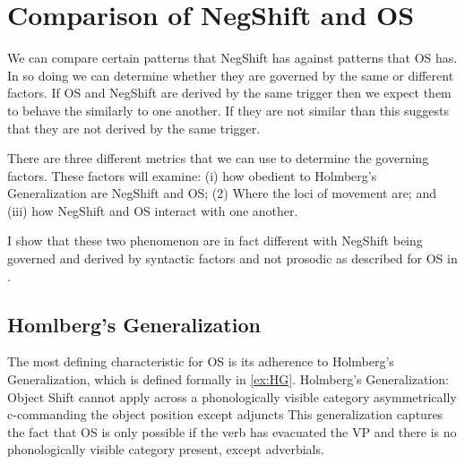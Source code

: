 \documentclass[12pt, letterpaper]{article}
\begin{document}
\section{Comparison of NegShift and OS} \label{sec:NEG-OS}
We can compare certain patterns that NegShift has against patterns that OS has. In so doing we can determine whether they are governed by the same or different factors. If OS and NegShift are derived by the same trigger then we expect them to behave the similarly to one another. If they are not similar than this suggests that they are not derived by the same trigger. 

There are three different metrics that we can use to determine the governing factors. These factors will examine: (i) how obedient to Holmberg's Generalization are NegShift and OS; (2) Where the loci of movement are; and (iii) how NegShift and OS interact with one another.   

I show that these two phenomenon are in fact different with NegShift being governed and derived by syntactic factors and not prosodic as described for OS in \citet{erteschik-shirSoundPatternsSyntax2005,erteschik-shirScandinavianObjectShift2017,erteschik-shirVariationMainlandScandinavian2020,brinkerhoffMATCHINGPhrasesNorwegian2021}.  

\subsection{Homlberg's Generalization} \label{sec:HG}

The most defining characteristic for OS is its adherence to Holmberg's Generalization, which is defined formally in \ref{ex:HG}.  
\ea \label{ex:HG} {Holmberg's Generalization:\\
Object Shift cannot apply across a phonologically visible category asymmetrically c-commanding the object position except adjuncts} 
\z
This generalization captures the fact that OS is only possible if the verb has evacuated the VP and there is no phonologically visible category present, except adverbials. 
\end{document}
